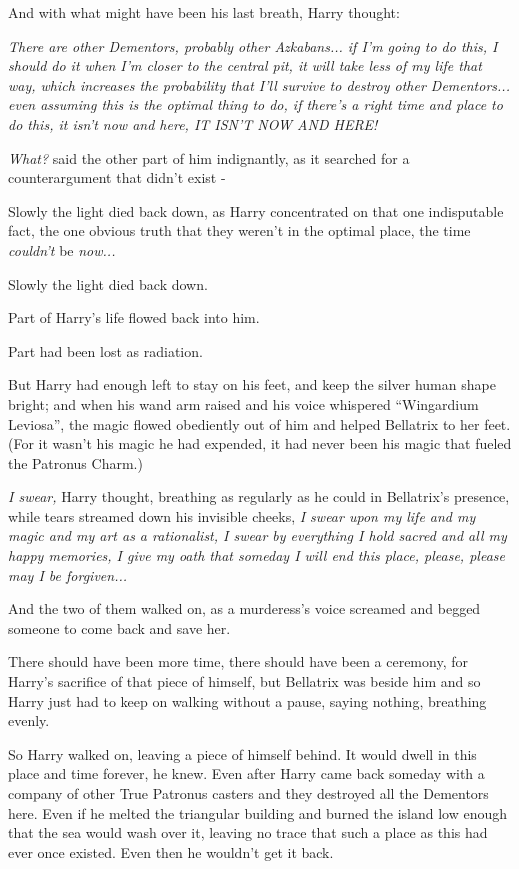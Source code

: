 And with what might have been his last breath, Harry thought:

\emph{There are other Dementors, probably other Azkabans... if I'm
going to do this, I should do it when I'm closer to the central pit, it
will take less of my life that way, which increases the probability that
I'll survive to destroy other Dementors... even assuming this is
the optimal thing to do, if there's a right time and place to do this,
it isn't now and here, IT ISN'T NOW AND HERE!}

\emph{What?} said the other part of him indignantly, as it searched for
a counterargument that didn't exist -

Slowly the light died back down, as Harry concentrated on that one
indisputable fact, the one obvious truth that they weren't in the
optimal place, the time \emph{couldn't} be \emph{now...}

Slowly the light died back down.

Part of Harry's life flowed back into him.

Part had been lost as radiation.

But Harry had enough left to stay on his feet, and keep the silver human
shape bright; and when his wand arm raised and his voice whispered
``Wingardium Leviosa'', the magic flowed obediently out of him and
helped Bellatrix to her feet. (For it wasn't his magic he had expended,
it had never been his magic that fueled the Patronus Charm.)

\emph{I swear,} Harry thought, breathing as regularly as he could in
Bellatrix's presence, while tears streamed down his invisible cheeks,
\emph{I swear upon my life and my magic and my art as a rationalist, I
swear by everything I hold sacred and all my happy memories, I give my
oath that someday I will end this place, please, please may I be
forgiven...}

And the two of them walked on, as a murderess's voice screamed and
begged someone to come back and save her.

There should have been more time, there should have been a ceremony, for
Harry's sacrifice of that piece of himself, but Bellatrix was beside him
and so Harry just had to keep on walking without a pause, saying
nothing, breathing evenly.

So Harry walked on, leaving a piece of himself behind. It would dwell in
this place and time forever, he knew. Even after Harry came back someday
with a company of other True Patronus casters and they destroyed all the
Dementors here. Even if he melted the triangular building and burned the
island low enough that the sea would wash over it, leaving no trace that
such a place as this had ever once existed. Even then he wouldn't get it
back.

